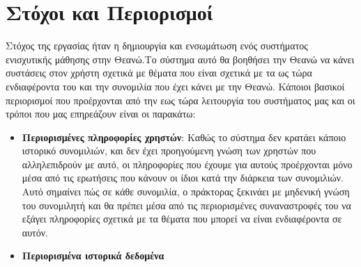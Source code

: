 \section{Στόχοι και Περιορισμοί}

Στόχος της εργασίας ήταν η δημιουργία και ενσωμάτωση ενός συστήματος ενισχυτικής μάθησης στην Θεανώ.Το σύστημα αυτό θα βοηθήσει την Θεανώ να κάνει συστάσεις στον χρήστη σχετικά με θέματα που είναι σχετικά με τα ως τώρα ενδιαφέροντα του και την συνομιλία που έχει κάνει με την Θεανώ. Κάποιοι βασικοί περιορισμοί που προέρχονται από την εως τώρα λειτουργία του συστήματος μας και οι τρόποι που μας επηρεάζουν είναι οι παρακάτω:

\begin{itemize}
    \item \textbf{Περιορισμένες πληροφορίες χρηστών}: Καθώς το σύστημα δεν κρατάει κάποιο ιστορικό συνομιλιών, και δεν έχει προηγούμενη γνώση των χρηστών που αλληλεπιδρούν με αυτό, οι πληροφορίες που έχουμε για αυτούς προέρχονται μόνο μέσα από τις ερωτήσεις που κάνουν οι ίδιοι κατά την διάρκεια των συνομιλιών. Αυτό σημαίνει πώς σε κάθε συνομιλία, ο πράκτορας ξεκινάει με μηδενική γνώση του συνομιλητή και θα πρέπει μέσα από τις περιορισμένες συναναστροφές του να εξάγει πληροφορίες σχετικά με τα θέματα που μπορεί να είναι ενδιαφέροντα σε αυτόν.
    \item \textbf{Περιορισμένα ιστορικά δεδομένα}
\end{itemize}
